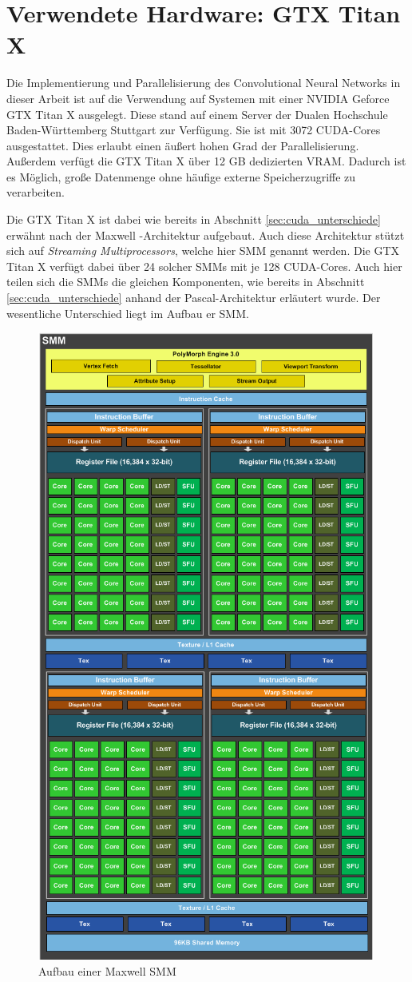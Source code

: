 \documentclass[../main.tex]{subfiles}
\begin{document}
\section{Verwendete Hardware: GTX Titan X} \label{sec:cuda_titan}
Die Implementierung und Parallelisierung des Convolutional Neural Networks in dieser Arbeit ist auf die Verwendung auf Systemen mit einer NVIDIA Geforce GTX Titan X ausgelegt. Diese stand auf einem Server der Dualen Hochschule Baden-Württemberg Stuttgart zur Verfügung. Sie ist mit 3072 CUDA-Cores ausgestattet. Dies erlaubt einen äußert hohen Grad der Parallelisierung. Außerdem verfügt die GTX Titan X über 12 GB dedizierten VRAM. Dadurch ist es Möglich, große Datenmenge ohne häufige externe Speicherzugriffe zu verarbeiten. \par Die GTX Titan X ist dabei wie bereits in Abschnitt \ref{sec:cuda_unterschiede}  erwähnt nach der Maxwell -Architektur aufgebaut. Auch diese Architektur stützt sich auf \emph{Streaming Multiprocessors}, welche hier SMM genannt werden. Die GTX Titan X verfügt dabei über 24 solcher SMMs mit je 128 CUDA-Cores. Auch hier teilen sich die SMMs die gleichen Komponenten, wie bereits in Abschnitt \ref{sec:cuda_unterschiede} anhand der Pascal-Architektur erläutert wurde. Der wesentliche Unterschied liegt im Aufbau er SMM. \par 
\begin{figure}[!htbp]
	\centering
	\includegraphics[width=0.6\linewidth]{../images/Riedle/Maxwell_SMM_Single.png}
	\caption{Aufbau einer Maxwell SMM \cite{CUDA_MAXWELL_white}} \label{pic:cuda_maxwell_smm_single}
\end{figure}
\end{document}
